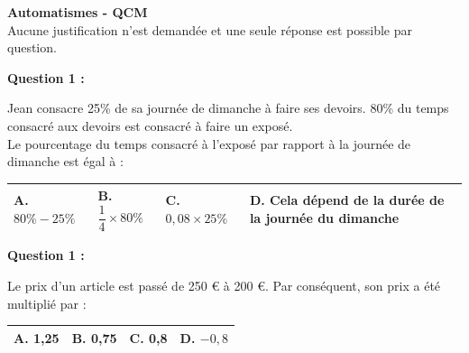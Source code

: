 \documentclass[12pt,a4paper]{article}
\begin{document}
\begin{center}
    \Large \textbf{Automatismes - QCM} \\[5pt]
    \normalsize Aucune justification n’est demandée et une seule réponse est possible
par question.
\end{center}

\vspace{0.7cm}

\textbf{Question 1 :} 
\vspace{5pt}

Jean consacre 25\% de sa journée de dimanche à faire ses devoirs.
80\% du temps consacré aux devoirs est consacré à faire un exposé.
\\Le pourcentage du temps consacré à l’exposé par rapport à la journée de dimanche
est égal à :
\vspace{0.3cm}

\renewcommand{\arraystretch}{3} %
\begin{tabular}{|m{3.4cm}|m{3.4cm}|m{3.4cm}|m{3.4cm}|}
\hline
\centering \vspace{-0.3cm} \textbf{A.} $80\% - 25\%$ & 
\centering \vspace{-0.3cm} \textbf{B.} $\dfrac{1}{4} \times 80\%$ & 
\centering \vspace{-0.3cm} \textbf{C.} $0,08 \times 25\%$ & 
\centering \vspace{-0.3cm} \textbf{D.} Cela dépend de la durée de la journée 
du dimanche \tabularnewline
\hline
\end{tabular}

\vspace{0.7cm}

\textbf{Question 1 :} 
\vspace{5pt}

Le prix d'un article est passé de 250 € à 200 €.  
Par conséquent, son prix a été multiplié par : 
\vspace{0.3cm}

\renewcommand{\arraystretch}{3} 
\begin{tabular}{|m{3.4cm}|m{3.4cm}|m{3.4cm}|m{3.4cm}|}
\hline
\centering \vspace{-0.3cm} \textbf{A.} 1,25 & 
\centering \vspace{-0.3cm} \textbf{B.} 0,75 & 
\centering \vspace{-0.3cm} \textbf{C.} 0,8 & 
\centering \vspace{-0.3cm} \textbf{D.} $-0,8$ \tabularnewline
\hline
\end{tabular}
\end{document}
